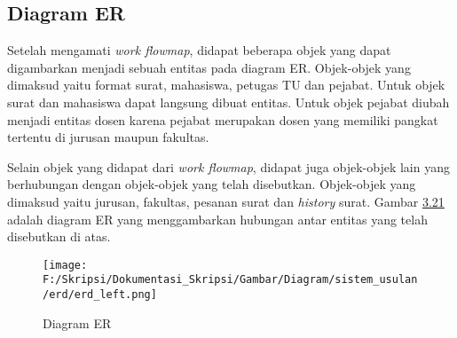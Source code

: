 \subsection{Diagram ER}
\label{sec:diagram_er}
Setelah mengamati \textit{work flowmap}, didapat beberapa objek yang dapat digambarkan menjadi sebuah entitas pada diagram ER. Objek-objek yang dimaksud yaitu format surat, mahasiswa, petugas TU dan pejabat. Untuk objek surat dan mahasiswa dapat langsung dibuat entitas. Untuk objek pejabat diubah menjadi entitas dosen karena pejabat merupakan dosen yang memiliki pangkat tertentu di jurusan maupun fakultas.\

Selain objek yang didapat dari \textit{work flowmap}, didapat juga objek-objek lain yang berhubungan dengan objek-objek yang telah disebutkan. Objek-objek yang dimaksud yaitu jurusan, fakultas, pesanan surat dan \textit{history} surat. Gambar \hyperlink{erd}{3.21} adalah diagram ER yang menggambarkan hubungan antar entitas yang telah disebutkan di atas.

\begin{figure}[H]
	\centering
		\texttt{[image: F:/Skripsi/Dokumentasi\_Skripsi/Gambar/Diagram/sistem\_usulan/erd/erd\_left.png]}
	\caption{Diagram ER}
	\label{fig:erd}
\end{figure}